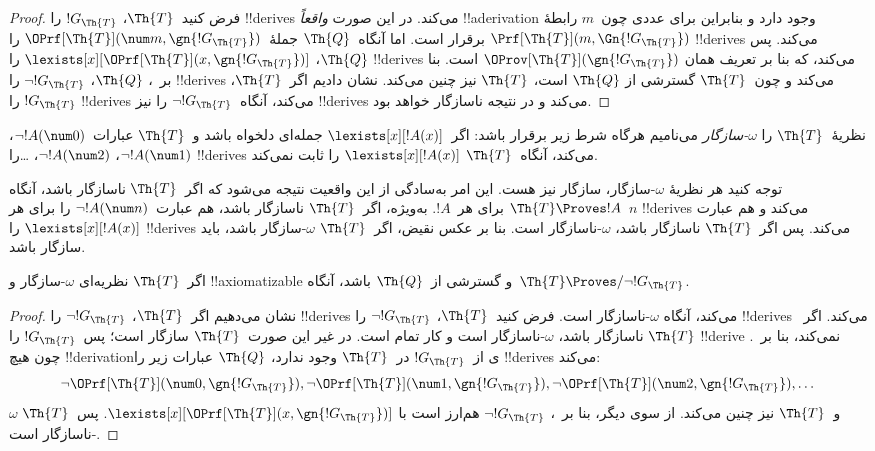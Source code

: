 \documentclass[../../../include/open-logic-section]{subfiles}
\begin{document}
\begin{proof}
فرض کنید~$\Th{T}$، $!G_\Th{T}$ را !!{derive}s می‌کند. در این صورت \emph{واقعاً}
!!a{derivation} وجود دارد و بنابراین برای عددی چون~$m$ رابطهٔ
$\Prf[\Th{T}](m, \Gn{!G_\Th{T}})$ برقرار است. اما آنگاه~$\Th{Q}$
جملهٔ~$\OPrf[\Th{T}](\num m, \gn{!G_\Th{T}})$ را !!{derive}s می‌کند. پس
$\Th{Q}$، $\lexists[x][\OPrf[\Th{T}](x,\gn{!G_\Th{T}})]$ را
!!{derive}s می‌کند، که بنا بر تعریف همان
$\OProv[\Th{T}](\gn{!G_\Th{T}})$ است. بنا بر~،
$\Th{Q}$، $\lnot !G_\Th{T}$ را !!{derive}s می‌کند و چون~$\Th{T}$ گسترشی از
$\Th{Q}$ است، $\Th{T}$ نیز چنین می‌کند. نشان دادیم اگر~$\Th{T}$،
$!G_\Th{T}$ را !!{derive}s می‌کند، آنگاه~$\lnot !G_\Th{T}$ را نیز
!!{derive}s می‌کند و در نتیجه ناسازگار خواهد بود.
\end{proof}

\begin{defn}
نظریهٔ~$\Th{T}$ را \emph{$\omega$-سازگار} می‌نامیم هرگاه شرط زیر
برقرار باشد: اگر~$\lexists[x][!A(x)]$ جمله‌ای دلخواه باشد و~$\Th{T}$
عبارات~$\lnot !A(\num 0)$، $\lnot !A(\num 1)$،
$\lnot !A(\num 2)$، \dots را !!{derive}s می‌کند، آنگاه~$\Th{T}$
$\lexists[x][!A(x)]$ را ثابت نمی‌کند.
\end{defn}

توجه کنید هر نظریهٔ $\omega$-سازگار، سازگار نیز هست. این امر به‌سادگی
از این واقعیت نتیجه می‌شود که اگر~$\Th{T}$ ناسازگار باشد، آنگاه
$\Th{T} \Proves !A$ برای هر~$!A$. به‌ویژه، اگر~$\Th{T}$ ناسازگار
باشد، هم عبارت~$\lnot !A(\num n)$ را برای هر~$n$ !!{derive}s می‌کند و هم عبارت
$\lexists[x][!A(x)]$ را !!{derive}s می‌کند. پس اگر~$\Th{T}$ ناسازگار باشد،
$\omega$-ناسازگار است. بنا بر عکس نقیض، اگر~$\Th{T}$
$\omega$-سازگار باشد، باید سازگار باشد.

\begin{lem}
اگر~$\Th{T}$ نظریه‌ای $\omega$-سازگار و !!{axiomatizable} و گسترشی
از~$\Th{Q}$ باشد، آنگاه~$\Th{T} \Proves/ \lnot !G_\Th{T}$.
\end{lem}

\begin{proof}
نشان می‌دهیم اگر~$\Th{T}$، $\lnot !G_\Th{T}$ را !!{derive}s می‌کند، آنگاه
$\omega$-ناسازگار است. فرض کنید~$\Th{T}$، $\lnot !G_\Th{T}$ را
!!{derive}s می‌کند. اگر~$\Th{T}$ ناسازگار باشد، $\omega$-ناسازگار است و کار
تمام است. در غیر این صورت~$\Th{T}$ سازگار است؛ پس~$!G_\Th{T}$ را
!!{derive} نمی‌کند، بنا بر~. چون هیچ
!!{derivation}ی از~$!G_\Th{T}$ در~$\Th{T}$ وجود ندارد، $\Th{Q}$
عبارات زیر را !!{derive}s می‌کند:
\[
\lnot \OPrf[\Th{T}](\num 0, \gn{!G_\Th{T}}), \lnot \OPrf[\Th{T}](\num 1,
\gn{!G_\Th{T}}), \lnot \OPrf[\Th{T}](\num 2, \gn{!G_\Th{T}}), \dots
\]
و~$\Th{T}$ نیز چنین می‌کند. از سوی دیگر، بنا بر~،
$\lnot !G_\Th{T}$ هم‌ارز است با
$\lexists[x][\OPrf[\Th{T}](x,\gn{!G_\Th{T}})]$. پس~$\Th{T}$
$\omega$-ناسازگار است.
\end{proof}
\end{document}

